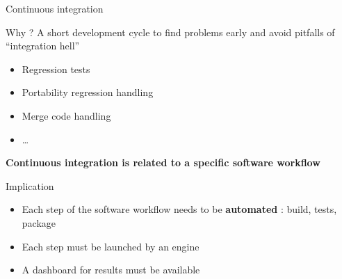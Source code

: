 \documentclass[9pt]{beamer}
\begin{document}
\begin{frame}{Continuous integration}

  \begin{block}{Why ?}
    A short development cycle to find problems early and avoid pitfalls of ``integration hell''
    \begin{itemize}
    \item Regression tests
    \item Portability regression handling
    \item Merge code handling
    \item \dots
  \end{itemize}

  \textbf{Continuous integration is related to a specific software workflow}

\end{block}

\begin{block}{Implication}
\begin{itemize}
\item Each step of the software workflow needs to be \textbf{automated} : build, tests, package
\item Each step must be launched by an engine
\item A dashboard for results must be available
\end{itemize}
\end{block}
\end{frame}
\end{document}
